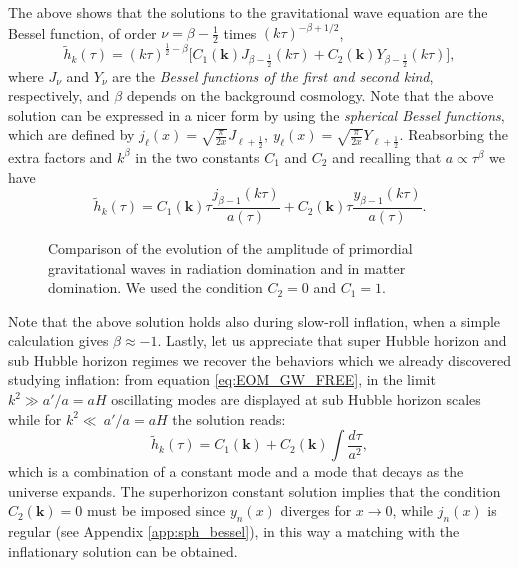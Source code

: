 The above shows that the solutions to the gravitational wave equation are the Bessel function, of order $\nu=\beta-\tfrac12$ times $(k\tau)^{-\beta+1/2}$,
$$\tilde h_k(\tau)=(k\tau)^{\frac{1}{2}-\beta}\bigg[C_1(\mathbf{k}) J_{\beta-\frac{1}{2}}(k\tau)+C_2(\mathbf{k}) Y_{\beta-\frac{1}{2}}(k\tau)\bigg],$$
where $J_\nu$ and $Y_\nu$ are the \emph{Bessel functions of the first and second kind}, respectively, and $\beta$ depends on the background cosmology. Note that the above solution can be expressed in a nicer form by using the \emph{spherical Bessel functions}, which are defined by $j_\ell(x)=\sqrt{\frac{\pi}{2x}}J_{\ell+\frac{1}{2}},\ y_\ell(x)=\sqrt{\frac{\pi}{2x}}Y_{\ell+\frac{1}{2}}$. Reabsorbing the extra factors and $k^{\beta}$ in the two constants $C_1$ and $C_2$ and recalling that $a\propto\tau^{\beta}$ we have
\begin{equation}
    \label{eq:free_GW_sol}
    \tilde h_k(\tau)=C_1(\mathbf{k})\tau\frac{j_{\beta-1}(k\tau)}{a(\tau)}+C_2(\mathbf{k})\tau\frac{y_{\beta-1}(k\tau)}{a(\tau)}.
\end{equation}
\begin{figure}
    \centering
{}
\caption{Comparison of the evolution of the amplitude of primordial gravitational waves in radiation domination and in matter domination. We used the condition $C_2=0$ and $C_1=1$. }
\label{fig:h_m/r}
\end{figure}
Note that the above solution holds also during slow-roll inflation, when a simple calculation gives $\beta\approx-1$. Lastly, let us appreciate that super Hubble horizon and sub Hubble horizon regimes we recover the behaviors which we already discovered studying inflation: from equation \eqref{eq:EOM_GW_FREE}, in the limit $k^2\gg a'/a=a H$ oscillating modes are displayed at sub Hubble horizon scales while for $k^2\ll\ a'/a=a H$ the solution reads:
$$\tilde h_k(\tau)=C_1(\mathbf k)+C_2(\mathbf k)\int\frac{d\tau}{a^2},$$ which is a combination of a constant mode and a mode that decays as the universe expands. The superhorizon constant solution implies that the condition $C_2(\mathbf k)=0$ must be imposed since $y_n(x)$ diverges for $x\to 0$, while $j_n(x)$ is regular (see Appendix \ref{app:sph_bessel}), in this way a matching with the inflationary solution can be obtained.
